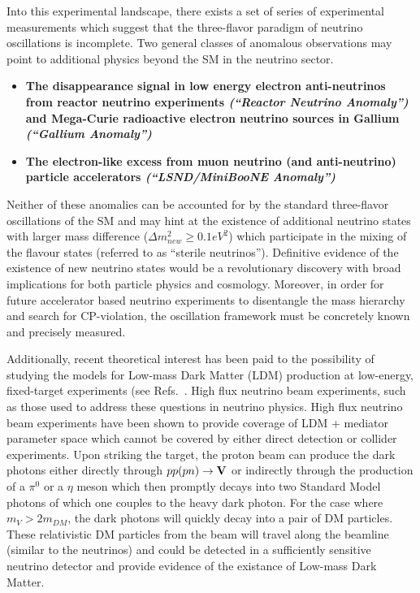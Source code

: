 Into this experimental landscape, there exists a set of series of experimental measurements which suggest that the three-flavor paradigm of neutrino oscillations is incomplete. Two general classes of anomalous observations may point to additional physics beyond the SM  in the neutrino sector.

\begin{itemize}
\item \textbf{The disappearance signal in low energy electron anti-neutrinos from reactor neutrino experiments \cite{No13} \textit{(``Reactor Neutrino Anomaly'')} and Mega-Curie radioactive electron neutrino sources in Gallium \cite{No14, No15} \textit{(``Gallium Anomaly'')}}

\item \textbf{The electron-like excess from muon neutrino (and anti-neutrino) particle accelerators \textit{(``LSND/MiniBooNE Anomaly'')} \cite{No16, No17}}

\end{itemize}

Neither of these anomalies can be accounted for by the standard three-flavor oscillations of the SM and may hint at the existence of additional neutrino states with larger mass difference ($\Delta m_{new}^{2}\geq 0.1 eV^{2}$) which participate in the mixing of the flavour states (referred to as ``sterile neutrinos''). Definitive evidence of the existence of new neutrino states would be a revolutionary discovery with broad implications for both particle physics and cosmology. Moreover, in order for future accelerator based neutrino experiments to disentangle the mass hierarchy and search for CP-violation, the oscillation framework must be concretely known and precisely measured.

Additionally, recent theoretical interest has been paid to the possibility of studying the models for Low-mass Dark Matter (LDM) production at low-energy, fixed-target experiments (see Refs.~\cite{if:ldm-1, if:ldm-2,if:ldm-3, if:ldm-4)}.  High flux neutrino beam experiments, such as those used to address these questions in neutrino physics. High flux neutrino beam experiments have been shown to provide coverage of LDM + mediator parameter space which cannot be covered by either direct detection or collider experiments. Upon striking the target, the proton beam can produce the dark photons either directly through $pp(pn)\rightarrow \bf {V}$ or indirectly through the production of a $\pi^{0}$ or a $\eta$ meson which then promptly decays into two Standard Model photons of which one couples to the heavy dark photon. For the case where $m_{V} > 2m_{DM}$, the dark photons will quickly decay into a pair of DM particles.  These relativistic DM particles from the beam will travel along the beamline (similar to the neutrinos) and could be detected in a sufficiently sensitive neutrino detector and provide evidence of the existance of Low-mass Dark Matter.

